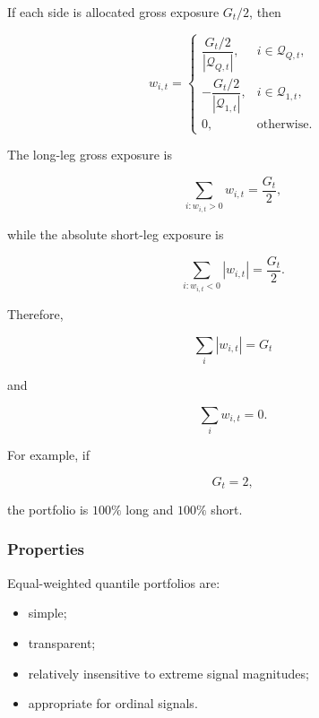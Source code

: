 \documentclass[11pt,a4paper]{article}
\begin{document}
If each side is allocated gross exposure $G_t/2$, then

\begin{equation}
\boxed{
w_{i,t}
=
\begin{cases}
\dfrac{G_t/2}{|\mathcal{Q}_{Q,t}|},
&
i\in\mathcal{Q}_{Q,t},
\\[0.30cm]
-\dfrac{G_t/2}{|\mathcal{Q}_{1,t}|},
&
i\in\mathcal{Q}_{1,t},
\\[0.30cm]
0,
&
\text{otherwise}.
\end{cases}
}
\end{equation}

The long-leg gross exposure is

\begin{equation}
\sum_{i:w_{i,t}>0}w_{i,t}
=
\frac{G_t}{2},
\end{equation}

while the absolute short-leg exposure is

\begin{equation}
\sum_{i:w_{i,t}<0}|w_{i,t}|
=
\frac{G_t}{2}.
\end{equation}

Therefore,

\begin{equation}
\sum_i |w_{i,t}|=G_t
\end{equation}

and

\begin{equation}
\sum_i w_{i,t}=0.
\end{equation}

For example, if

\begin{equation}
G_t=2,
\end{equation}

the portfolio is $100\%$ long and $100\%$ short.


\subsubsection{Properties}

Equal-weighted quantile portfolios are:

\begin{itemize}
    \item simple;
    \item transparent;
    \item relatively insensitive to extreme signal magnitudes;
    \item appropriate for ordinal signals.
\end{itemize}
\end{document}
